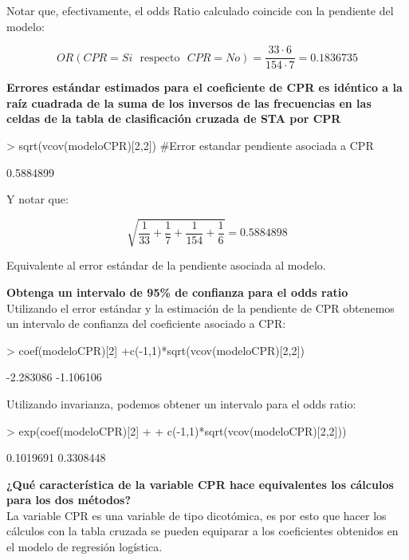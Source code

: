 \documentclass[11pt,onside]{article}
\begin{document}
\begin{itemize}
Notar que, efectivamente, el odds Ratio calculado coincide con la pendiente del modelo:

$$OR(CPR=Si \ \ \ \text{respecto} \ \ \  CPR=No)=\frac{33\cdot 6}{154 \cdot 7}=0.1836735$$


\textbf{Errores estándar estimados para el coeficiente de CPR es idéntico a la raíz cuadrada de la suma de los inversos de las frecuencias en las celdas de la tabla de clasificación cruzada de STA por CPR}\\

\begin{Schunk}
\begin{Sinput}
> sqrt(vcov(modeloCPR)[2,2])  #Error estandar pendiente asociada a CPR
\end{Sinput}
\begin{Soutput}
[1] 0.5884899
\end{Soutput}
\end{Schunk}

Y notar que:

$$\sqrt{\frac{1}{33}+\frac{1}{7}+\frac{1}{154}+\frac{1}{6}}=0.5884898$$

Equivalente al error estándar de la pendiente asociada al modelo.


\textbf{Obtenga un intervalo de 95\% de confianza para el odds ratio}\\

Utilizando el error estándar y la estimación de la pendiente de CPR obtenemos un intervalo de confianza del coeficiente asociado a CPR:

\begin{Schunk}
\begin{Sinput}
> coef(modeloCPR)[2] +c(-1,1)*sqrt(vcov(modeloCPR)[2,2])
\end{Sinput}
\begin{Soutput}
[1] -2.283086 -1.106106
\end{Soutput}
\end{Schunk}

Utilizando invarianza, podemos obtener un intervalo para el odds ratio:

\begin{Schunk}
\begin{Sinput}
> exp(coef(modeloCPR)[2] +
+       c(-1,1)*sqrt(vcov(modeloCPR)[2,2]))
\end{Sinput}
\begin{Soutput}
[1] 0.1019691 0.3308448
\end{Soutput}
\end{Schunk}


\textbf{¿Qué característica de la variable CPR hace equivalentes los cálculos para los dos métodos?}\\

La variable CPR es una variable de tipo dicotómica, es por esto que hacer los cálculos con la tabla cruzada se pueden equiparar a los coeficientes obtenidos en el modelo de regresión logística.
\end{itemize}
\end{document}
